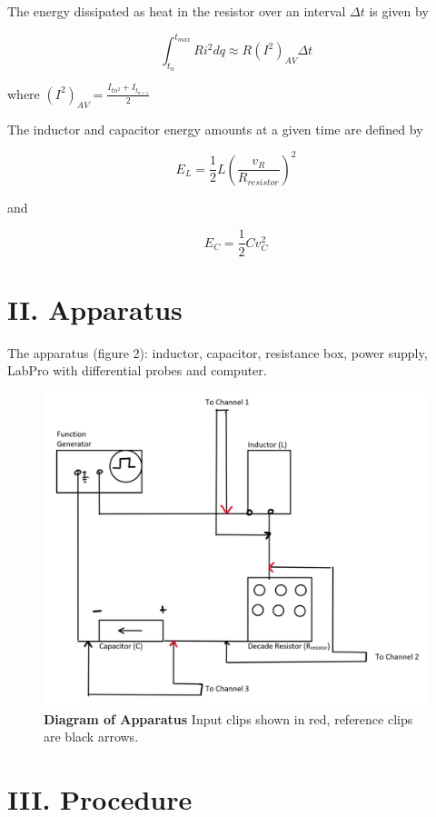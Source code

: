 \documentclass[twocolumn, letterpaper, 10pt, twoside]{article}
\begin{document}
The energy dissipated as heat in the resistor over an interval $\Delta t$ is given by 

\begin{equation}
	\int_{t_n}^{t_{max}}Ri^2dq \approx R(I^2)_{AV} \Delta t
\end{equation}

where $(I^2)_{AV} = \frac{I_{tn^2} + I_{t_{n+1}}}{2}$

The inductor and capacitor energy amounts at a given time are defined by

\begin{equation}
E_L = \frac{1}{2} L (\frac{v_R}{R_{resistor}})^2
\end{equation}

and 

\begin{equation}
E_C = \frac{1}{2} Cv_C^2
\end{equation}


 \section*{II. Apparatus}
    The apparatus (figure 2): inductor, capacitor, resistance box, power supply, LabPro with differential probes and computer. 
    
    \begin{figure}[H]
   	\centering
   	\includegraphics[width=.7\linewidth]{apparatus.jpg}
   	\captionsetup{width=.8\linewidth,belowskip=-2mm,aboveskip=1mm}
   	\vspace{0.2cm}
   	\caption{\textbf{Diagram of Apparatus} Input clips shown in red, reference clips are black arrows.}
   \end{figure}
   
 \section*{III. Procedure}
      
\end{document}
